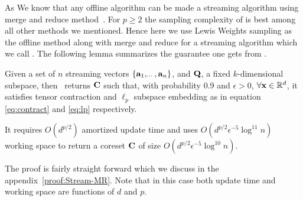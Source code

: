 As We know that any offline algorithm can be made a streaming algorithm using merge and reduce method~\cite{har2004coresets}. For $p \geq 2$ the sampling complexity of \cite{cohen2015p} is best among all other methods we mentioned. Hence here we use Lewis Weights sampling \cite{cohen2015p} as the offline method along with merge and reduce for a streaming algorithm which we call \mrlw. The following lemma summarizes the guarantee one gets from \mrlw.
\begin{lemma}\label{lemma:Stream-MR}
 Given a set of $n$ streaming vectors $\{\mathbf{a}_{1},_{\cdots}, \mathbf{a}_{n}\}$, and $\mathbf{Q}$, a fixed $k$-dimensional subspace, then \mrlw~returns $\mathbf{C}$ such that, with probability 0.9 and $\epsilon > 0$, $\forall \mathbf{x}\in \mathbb{R}^{d}$, it satisfies tensor contraction and $\ell_{p}$ subspace embedding as in equation \eqref{eq:contract} and \eqref{eq:lp} respectively.

 It requires $O(d^{p/2})$ amortized update time and uses $O(d^{p/2}\epsilon^{-5}\log^{11} n)$ working space to return a coreset $\mathbf{C}$ of size $O(d^{p/2}\epsilon^{-5}\log^{10} n)$.
\end{lemma}
The proof is fairly straight forward which we discuss in the appendix~\ref{proof:Stream-MR}. Note that in this case both update time and working space are functions of $d$ and $p$. 

